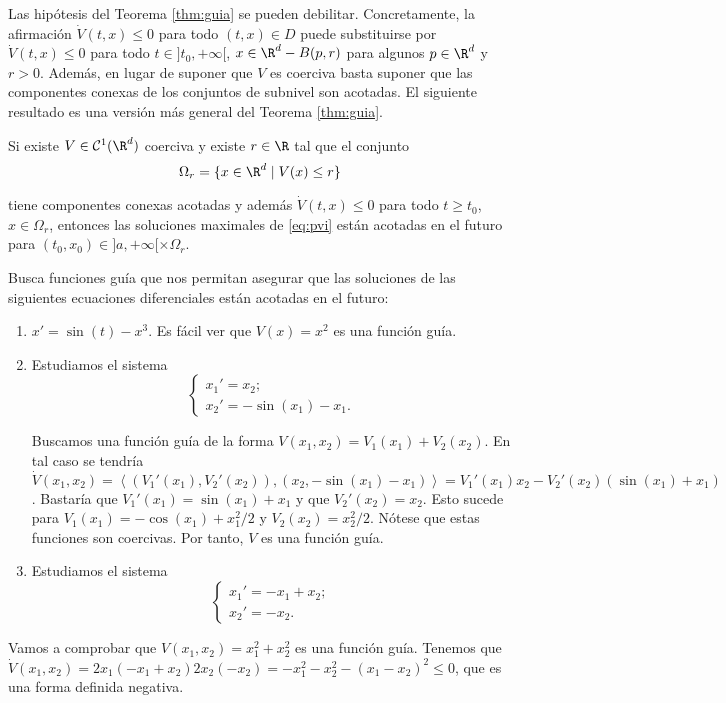 \documentclass{article}
\begin{document}
\begin{remark}
  Las hipótesis del Teorema \ref{thm:guia} se pueden debilitar. Concretamente, la afirmación
  $\dot{V}(t,x) \le 0$ para todo $(t,x) \in D$ puede substituirse por $\dot{V}(t,x) \le 0$ para todo
  $t \in ]t_0, +\infty[$, $x \in \R^d - B(p, r)$ para algunos $p \in \R^d$ y $ r > 0$. Además, en
  lugar de suponer que $V$ es coerciva basta suponer que las componentes conexas de los conjuntos de
  subnivel son acotadas. El siguiente resultado es una versión más general del Teorema
  \ref{thm:guia}.
\end{remark}

\begin{theorem}
  \label{thm:guia:2}
  Si existe $V\in \mathcal{C}^1(\R^d)$ coerciva y existe $r \in \R$ tal que el conjunto
  \[ \Omega_r = \{x \in \R^d \mid V(x) \le r\} \]

  tiene componentes conexas acotadas y además $\dot{V}(t,x) \le 0$ para todo $t \ge
  t_0$,$x \in \Omega_r$, entonces las soluciones maximales de \eqref{eq:pvi} están acotadas en el
  futuro para $(t_0, x_0) \in ]a, +\infty[ \times \Omega_r$.
\end{theorem}


\begin{ex} 
  Busca funciones guía que nos permitan asegurar que las soluciones de las siguientes ecuaciones
  diferenciales están acotadas en el futuro:
  \begin{enumerate}
  \item $x' = \sin(t) - x^{3}$. Es fácil ver que $V(x) = x^2$ es una función guía.
  \item Estudiamos el sistema
    \[
      \begin{cases}
        x_1' = x_2; \\
        x_2' = -\sin(x_1)-x_1.
      \end{cases}
    \]

    Buscamos una función guía de la forma $V(x_1, x_2) = V_1(x_1) + V_2(x_2)$. En tal caso se
    tendría
    $\dot{V}(x_1, x_2) = \left\langle (V_1'(x_1), V_2'(x_2)), (x_2, -\sin(x_1) - x_1) \right\rangle
    = V_1'(x_1) x_2 - V_2'(x_2)(\sin(x_1) + x_1)$. Bastaría que $V_1'(x_1) = \sin(x_1) + x_1$ y que
    $V_2'(x_2) = x_2$. Esto sucede para $V_1(x_1) = - \cos(x_1) + x_1^2/ 2$ y
    $V_2(x_2) = x_2^2 / 2$. Nótese que estas funciones son coercivas. Por tanto, $V$ es una función
    guía.
  \item Estudiamos el sistema
    \[
      \begin{cases}
        x_1' = -x_1 + x_2; \\
        x_2' = -x_2.
      \end{cases}
    \]
  \end{enumerate}
  Vamos a comprobar que $V(x_1, x_2) = x_1^2 + x_2^2$ es una función guía. Tenemos que
  $\dot{V}(x_1, x_2) = 2x_1(-x_1+x_2) 2x_2(-x_2) = - x_1^2 - x_2^2 - (x_1-x_2)^2 \le 0$, que es una
  forma definida negativa.
\end{ex}
\end{document}
